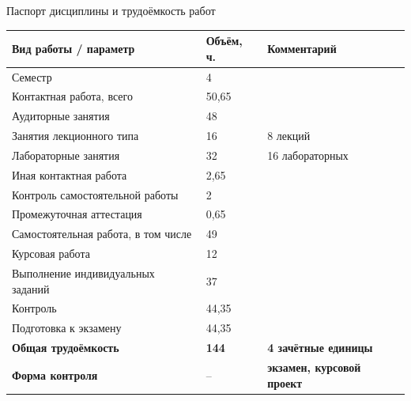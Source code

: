 \documentclass[aspectratio=169,10pt]{beamer}
\begin{document}
\begin{frame}{Паспорт дисциплины и трудоёмкость работ}
\scriptsize
\begin{adjustbox}{max width=\textwidth,max totalheight=0.83\textheight,center}
\begin{tabular}{L{9.6cm} C{2.1cm} L{3.8cm}}
\toprule
\textbf{Вид работы / параметр} & \textbf{Объём, ч.} & \textbf{Комментарий} \\
\midrule
Семестр & 4 &  \\
Контактная работа, всего & 50,65 &  \\
\quad Аудиторные занятия & 48 &  \\
\quad\quad Занятия лекционного типа & 16 & 8 лекций \\
\quad\quad Лабораторные занятия & 32 & 16 лабораторных \\
\quad Иная контактная работа & 2,65 &  \\
\quad\quad Контроль самостоятельной работы & 2 &  \\
\quad\quad Промежуточная аттестация & 0,65 &  \\
Самостоятельная работа, в том числе & 49 &  \\
\quad Курсовая работа & 12 &  \\
\quad Выполнение индивидуальных заданий & 37 &  \\
Контроль & 44,35 &  \\
\quad Подготовка к экзамену & 44,35 &  \\
\midrule
\textbf{Общая трудоёмкость} & \textbf{144} & \textbf{4 зачётные единицы} \\
\textbf{Форма контроля} & -- & \textbf{экзамен, курсовой проект} \\
\bottomrule
\end{tabular}
\end{adjustbox}
\end{frame}
\end{document}
